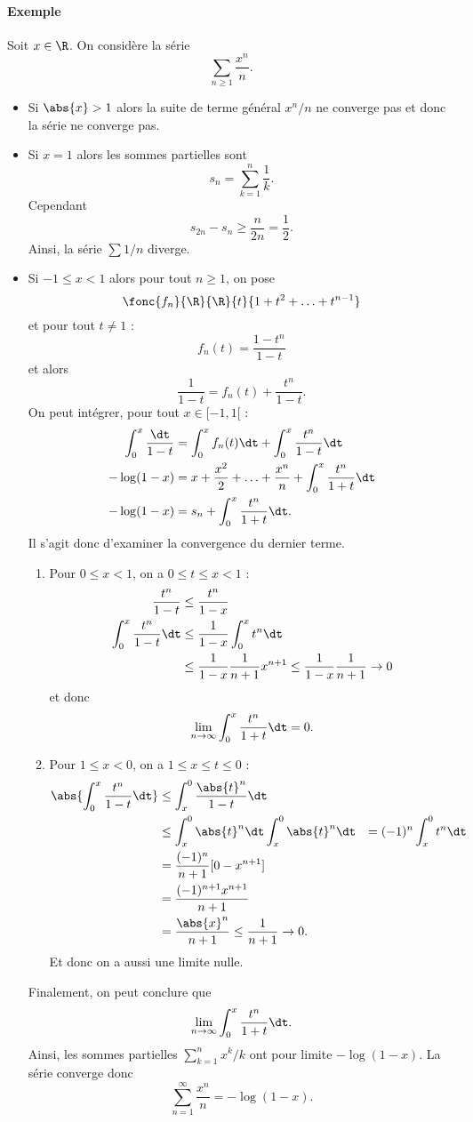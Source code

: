 \documentclass{livre}
\begin{document}
\paragraph{Exemple}Soit $x\in \R$. On considère la série \[ \sum_{n\geq 1}\frac{x^{n}}{n}.\]
\begin{itemize}
\item Si $\abs{x}>1$ alors la suite de terme général $x^{n}/n$ ne converge pas et donc la série ne converge pas.
\item Si $x=1$ alors les sommes partielles sont \[ s_n = \sum_{k=1}^{n}\frac{1}{k}.\]Cependant \[ s_{2n} - s_n \geq \frac{n}{2n} = \frac{1}{2}.\]Ainsi, la série $\sum 1/n$ diverge.
\item Si $-1\leq x<1$ alors pour tout $n\geq 1$, on pose \[ \fonc{f_n}{\R}{\R}{t}{1+t^{2}+\ldots+t^{n-1}}\]et pour tout $t\neq 1$ : \[f_{n}(t) = \frac{1-t^{n}}{1-t} \]et alors \[\frac{1}{1-t}= f_n(t) + \frac{t^{n}}{1-t}. \]On peut intégrer, pour tout $x\in[-1,1[$ : 
\begin{align*}
\int_{0}^{x}\frac{\dt}{1-t} &= \int_{0}^{x}f_n(t)\dt + \int_{0}^{x}\frac{t^{n}}{1-t}\dt\\
-\log(1-x) &= x + \frac{x^{2}}{2} +\ldots + \frac{x^{n}}{n} + \int_{0}^{x}\frac{t^{n}}{1+t}\dt\\
-\log(1-x) &= s_n+ \int_{0}^{x}\frac{t^{n}}{1+t}\dt.
\end{align*}
Il s'agit donc d'examiner la convergence du dernier terme. 
\begin{enumerate}
\item Pour $0\leq x < 1$, on a $0\leq t \leq x < 1$ : 
\begin{align*}
\frac{t^{n}}{1-t} &\leq \frac{t^{n}}{1-x} \\
\int_{0}^{x}\frac{t^{n}}{1-t}\dt &\leq \frac{1}{1-x}\int_{0}^{x}t^{n}\dt \\
&\leq \frac{1}{1-x}\frac{1}{n+1}x^{n+1}\leq \frac{1}{1-x}\frac{1}{n+1} \to 0
\end{align*}
et donc \[ \lim_{n\to\infty} \int_{0}^{x}\frac{t^{n}}{1+t}\dt = 0. \]
\item Pour $1\leq x < 0$, on a $1\leq x \leq t \leq 0$ :
\begin{align*}
\abs{\int_{0}^{x}\frac{t^{n}}{1-t}\dt} &\leq \int_{x}^{0}\frac{\abs{t}^{n}}{1-t}\dt \\
&\leq \int_{x}^{0}\abs{t}^{n}\dt 
\int_{x}^{0}\abs{t}^{n}\dt &= (-1)^{n}\int_{x}^{0}t^{n}\dt \\
&= \frac{(-1)^{n}}{n+1}[ 0 -x^{n+1}] \\
&= \frac{(-1)^{n+1}x^{n+1}}{n+1}\\
&= \frac{\abs{x}^{n}}{n+1} \leq \frac{1}{n+1}\to 0.
\end{align*}
Et donc on a aussi une limite nulle.
\end{enumerate}
Finalement, on peut conclure que \[\lim_{n\to \infty} \int_{0}^{x}\frac{t^{n}}{1+t}\dt. \]Ainsi, les sommes partielles $\sum_{k=1}^{n}x^{k}/k$ ont pour limite $-\log(1-x)$. La série converge donc \[ \sum_{n=1}^{\infty}\frac{x^{n}}{n} = -\log(1-x).\]
\end{itemize}
\end{document}
